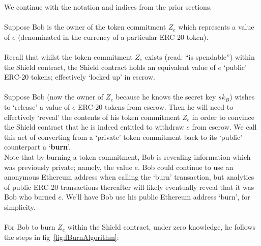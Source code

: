 \documentclass{article}
\begin{document}
We continue with the notation and indices from the prior sections.\\
\\
Suppose Bob is the owner of the token commitment $Z_e$ which represents a value of $e$ (denominated in the currency of a particular ERC-20 token).\\
\\
Recall that whilst the token commitment $Z_e$ exists (read: ``is spendable'') within the Shield contract, the Shield contract holds an equivalent value of $e$ `public' ERC-20 tokens; effectively `locked up' in escrow.\\
\\
Suppose Bob (now the owner of $Z_e$ because he knows the secret key $sk_B$) wishes to `release' a value of $e$ ERC-20 tokens from escrow.
Then he will need to effectively `reveal' the contents of his token commitment $Z_e$ in order to convince the Shield contract that he is indeed entitled to withdraw $e$ from escrow.
We call this act of converting from a `private' token commitment back to its `public' counterpart a `\textbf{burn}'.
\\
Note that by burning a token commitment, Bob is revealing information which was previously private; namely, the value $e$. Bob could continue to use an anonymous Ethereum address when calling the `burn' transaction, but analytics of public ERC-20 transactions thereafter will likely eventually reveal that it was Bob who burned $e$. We'll have Bob use his public Ethereum address `burn', for simplicity.\\
\\

\noindent
For Bob to burn $Z_e$ within the Shield contract, under zero knowledge, he follows the steps in fig~\ref{fig:fBurnAlgorithm}:
\end{document}
